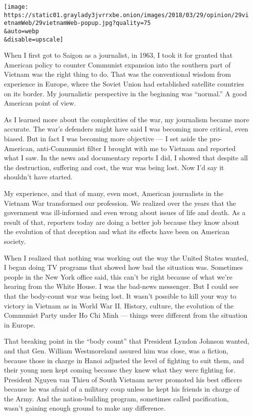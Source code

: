 \texttt{[image: https://static01.graylady3jvrrxbe.onion/images/2018/03/29/opinion/29vietnamWeb/29vietnamWeb-popup.jpg?quality=75\\\&auto=webp\\\&disable=upscale]}

When I first got to Saigon as a journalist, in 1963, I took it for
granted that American policy to counter Communist expansion into the
southern part of Vietnam was the right thing to do. That was the
conventional wisdom from experience in Europe, where the Soviet Union
had established satellite countries on its border. My journalistic
perspective in the beginning was ``normal.'' A good American point of
view.

As I learned more about the complexities of the war, my journalism
became more accurate. The war's defenders might have said I was becoming
more critical, even biased. But in fact I was becoming more objective
--- I set aside the pro-American, anti-Communist filter I brought with
me to Vietnam and reported what I saw. In the news and documentary
reports I did, I showed that despite all the destruction, suffering and
cost, the war was being lost. Now I'd say it shouldn't have started.

My experience, and that of many, even most, American journalists in the
Vietnam War transformed our profession. We realized over the years that
the government was ill-informed and even wrong about issues of life and
death. As a result of that, reporters today are doing a better job
because they know about the evolution of that deception and what its
effects have been on American society.

When I realized that nothing was working out the way the United States
wanted, I began doing TV programs that showed how bad the situation was.
Sometimes people in the New York office said, this can't be right
because of what we're hearing from the White House. I was the bad-news
messenger. But I could see that the body-count war was being lost. It
wasn't possible to kill your way to victory in Vietnam as in World War
II. History, culture, the evolution of the Communist Party under Ho Chi
Minh --- things were different from the situation in Europe.

That breaking point in the ``body count'' that President Lyndon Johnson
wanted, and that Gen. William Westmoreland assured him was close, was a
fiction, because those in charge in Hanoi adjusted the level of fighting
to suit them, and their young men kept coming because they knew what
they were fighting for. President Nguyen van Thieu of South Vietnam
never promoted his best officers because he was afraid of a military
coup unless he kept his friends in charge of the Army. And the
nation-building program, sometimes called pacification, wasn't gaining
enough ground to make any difference.

